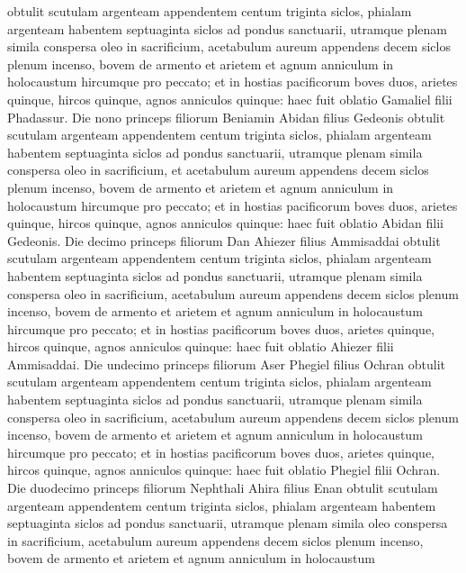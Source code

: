 \begin{biblechapter}
\verse obtulit scutulam argenteam appendentem centum triginta siclos, phialam argenteam habentem septuaginta siclos ad pondus sanctuarii, utramque plenam simila conspersa oleo in sacrificium, 
\verse acetabulum aureum appendens decem siclos plenum incenso, 
\verse bovem de armento et arietem et agnum anniculum in holocaustum 
\verse hircumque pro peccato; 
\verse et in hostias pacificorum boves duos, arietes quinque, hircos quinque, agnos anniculos quinque: haec fuit oblatio Gamaliel filii Phadassur. 
\verse Die nono princeps filiorum Beniamin Abidan filius Gedeonis 
\verse obtulit scutulam argenteam appendentem centum triginta siclos, phialam argenteam habentem septuaginta siclos ad pondus sanctuarii, utramque plenam simila conspersa oleo in sacrificium, 
\verse et acetabulum aureum appendens decem siclos plenum incenso, 
\verse bovem de armento et arietem et agnum anniculum in holocaustum 
\verse hircumque pro peccato; 
\verse et in hostias pacificorum boves duos, arietes quinque, hircos quinque, agnos anniculos quinque: haec fuit oblatio Abidan filii Gedeonis. 
\verse Die decimo princeps filiorum Dan Ahiezer filius Ammisaddai 
\verse obtulit scutulam argenteam appendentem centum triginta siclos, phialam argenteam habentem septuaginta siclos ad pondus sanctuarii, utramque plenam simila conspersa oleo in sacrificium, 
\verse acetabulum aureum appendens decem siclos plenum incenso, 
\verse bovem de armento et arietem et agnum anniculum in holocaustum 
\verse hircumque pro peccato; 
\verse et in hostias pacificorum boves duos, arietes quinque, hircos quinque, agnos anniculos quinque: haec fuit oblatio Ahiezer filii Ammisaddai. 
\verse Die undecimo princeps filiorum Aser Phegiel filius Ochran 
\verse obtulit scutulam argenteam appendentem centum triginta siclos, phialam argenteam habentem septuaginta siclos ad pondus sanctuarii, utramque plenam simila conspersa oleo in sacrificium, 
\verse acetabulum aureum appendens decem siclos plenum incenso, 
\verse bovem de armento et arietem et agnum anniculum in holocaustum 
\verse hircumque pro peccato; 
\verse et in hostias pacificorum boves duos, arietes quinque, hircos quinque, agnos anniculos quinque: haec fuit oblatio Phegiel filii Ochran. 
\verse Die duodecimo princeps filiorum Nephthali Ahira filius Enan 
\verse obtulit scutulam argenteam appendentem centum triginta siclos, phialam argenteam habentem septuaginta siclos ad pondus sanctuarii, utramque plenam simila oleo conspersa in sacrificium, 
\verse acetabulum aureum appendens decem siclos plenum incenso, 
\verse bovem de armento et arietem et agnum anniculum in holocaustum  

\end{biblechapter}
